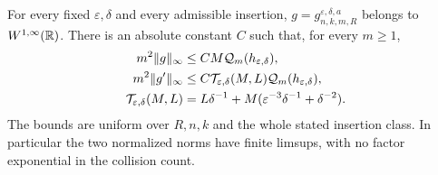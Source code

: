 \begin{theorem}
\label{thm:v46-noncritical-density}
For every fixed $\varepsilon,\delta$ and every admissible insertion,
$g=g^{\varepsilon,\delta,a}_{n,k,m,R}$ belongs to $W^{1,\infty}(\mathbb R)$.
There is an absolute constant $C$ such that, for every $m\ge1$,
\begin{align}
 m^2\|g\|_\infty
   &\le CM\mathcal Q_m(h_{\varepsilon,\delta}),\notag\\
 m^2\|g'\|_\infty
   &\le C\mathcal T_{\varepsilon,\delta}(M,L)
                   \mathcal Q_m(h_{\varepsilon,\delta}),
                                      \label{eq:v46-regular-density-budget}\\
 \mathcal T_{\varepsilon,\delta}(M,L)
   &=L\delta^{-1}+M(\varepsilon^{-3}\delta^{-1}+\delta^{-2}).\notag
\end{align}
The bounds are uniform over $R,n,k$ and the whole stated insertion
class. In particular the two normalized norms have finite limsups,
with no factor exponential in the collision count.
\end{theorem}
